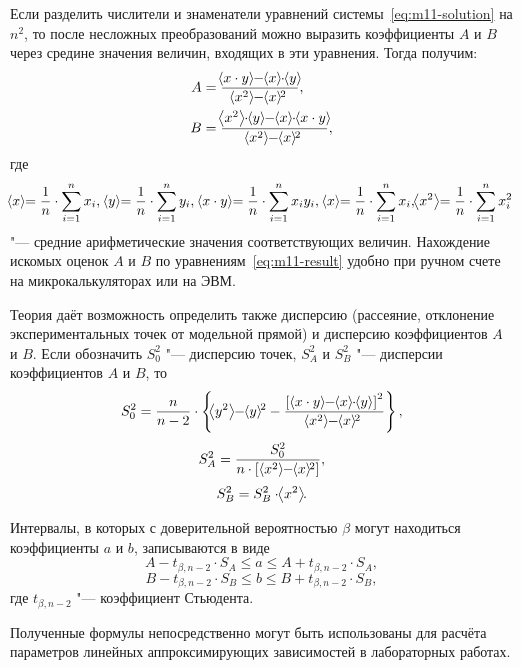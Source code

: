 \documentclass[a4paper, 12pt]{extarticle}
\newcommand{\isum}{\sum\limits_{i=1}^{n}}
\begin{document}
Если разделить числители и знаменатели уравнений системы~\eqref{eq:m11-solution} на $n^2$, то после несложных преобразований можно выразить коэффициенты $A$ и $B$ через средине значения величин, входящих в эти уравнения. Тогда получим: %
\begin{equation}
\label{eq:m11-result}
\aligned
A &= \frac{\MTDMean{x \cdot y} - \MTDMean{x} \cdot \MTDMean{y}}{\MTDMean{x^2} - \MTDMean{x}^2}, \\
B &= \frac{\MTDMean{x^2} \cdot \MTDMean{y} - \MTDMean{x} \cdot \MTDMean{x \cdot y}}{\MTDMean{x^2} - \MTDMean{x}^2},
\endaligned
\end{equation}
где 
\[
\MTDMean{x} = \frac{1}{n} \cdot \isum x_i, \ \MTDMean{y} = \frac{1}{n} \cdot \isum y_i, \ \MTDMean{x \cdot y} = \frac{1}{n} \cdot \isum x_i y_i, \ \MTDMean{x} = \frac{1}{n} \cdot \isum x_i, \MTDMean{x^2} = \frac{1}{n} \cdot \isum x_i^2
\]
"--- средние арифметические значения соответствующих величин. Нахождение искомых оценок $A$ и $B$ по уравнениям~\eqref{eq:m11-result} удобно при ручном счете на микрокалькуляторах или на ЭВМ. %

Теория даёт возможность определить также дисперсию (рассеяние, отклонение экспериментальных точек от модельной прямой) и дисперсию коэффициентов $A$ и $B$. Если обозначить $S_0^2$ "--- дисперсию точек, $S_A^2$  и $S_B^2$  "--- дисперсии коэффициентов $A$ и $B$, то 
\begin{equation}
\label{eq:m11-S_0^2}
S_0^2 = \frac{n}{n - 2} \cdot \left\{ \MTDMean{y^2} - \MTDMean{y}^2 - \frac{\left[ \hspace{3pt} \MTDMean{x \cdot y} - \MTDMean{x} \cdot \MTDMean{y} \hspace{3pt} \right] ^2}{\MTDMean{x^2} - \MTDMean{x}^2} \right\}, %
\end{equation}
\begin{equation}
\label{eq:m11-S_A^2}
S_A^2 =\frac{S_0^2}{n \cdot \left[ \hspace{3pt} \MTDMean{x^2} - \MTDMean{x}^2 \right]},
\end{equation}
\begin{equation}
\label{eq:m11-S_B^2}
S_B^2 = S_B^2 \cdot \hspace{-3pt}\left<x^2\right>\hspace{-3pt}.
\end{equation}

Интервалы, в которых с доверительной вероятностью $\beta$ могут находиться коэффициенты $a$ и $b$, записываются в виде
\begin{equation}
\label{eq:m11-range-1}
A - t_{\beta, n - 2} \cdot S_A \le a \le A + t_{\beta, n - 2} \cdot S_A,
\end{equation}
\begin{equation}
\label{eq:m11-range-2}
B - t_{\beta, n - 2} \cdot S_B \le b \le B + t_{\beta, n - 2} \cdot S_B,
\end{equation}
где $t_{\beta, n-2}$ "--- коэффициент Стьюдента. 

Полученные формулы непосредственно могут быть использованы для расчёта параметров линейных аппроксимирующих зависимостей в лабораторных работах. 
\end{document}
